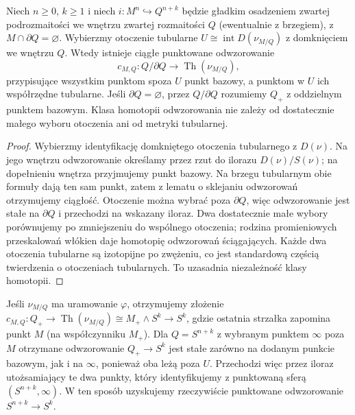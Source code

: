 \begin{lemat}
\label{lem:pt-collapse-v9}
Niech $n\ge0$, $k\ge1$ i niech
$i:M^n\hookrightarrow Q^{n+k}$ będzie gładkim
osadzeniem zwartej podrozmaitości we wnętrzu zwartej
rozmaitości $Q$ (ewentualnie z brzegiem), z
$M\cap\partial Q=\varnothing$. Wybierzmy otoczenie tubularne
$U\cong \operatorname{int}D(\nu_{M/Q})$ z domknięciem
we wnętrzu $Q$. Wtedy istnieje ciągłe punktowane
odwzorowanie
\[
c_{M,Q}: Q/\partial Q\longrightarrow
\operatorname{Th}(\nu_{M/Q}),
\]
przypisujące wszystkim punktom spoza $U$ punkt bazowy,
a punktom w $U$ ich współrzędne tubularne. Jeśli
$\partial Q=\varnothing$, przez $Q/\partial Q$ rozumiemy
$Q_+$ z oddzielnym punktem bazowym. Klasa homotopii
odwzorowania nie zależy od dostatecznie małego
wyboru otoczenia ani od metryki tubularnej.
\end{lemat}
\begin{proof}
Wybierzmy identyfikację domkniętego otoczenia
tubularnego z $D(\nu)$. Na jego wnętrzu odwzorowanie określamy przez
rzut do ilorazu $D(\nu)/S(\nu)$; na dopełnieniu
wnętrza przyjmujemy punkt bazowy. Na brzegu tubularnym
obie formuły dają ten sam punkt, zatem z lematu o
sklejaniu odwzorowań otrzymujemy ciągłość.
Otoczenie można wybrać poza $\partial Q$, więc
odwzorowanie jest stałe na $\partial Q$ i przechodzi
na wskazany iloraz. Dwa dostatecznie małe wybory
porównujemy po zmniejszeniu do wspólnego otoczenia;
rodzina promieniowych przeskalowań włókien daje
homotopię odwzorowań ściągających. Każde dwa
otoczenia tubularne są izotopijne po zwężeniu,
co jest standardową częścią twierdzenia o otoczeniach
tubularnych. To uzasadnia niezależność klasy homotopii.
\end{proof}

Jeśli $\nu_{M/Q}$ ma uramowanie $\varphi$, otrzymujemy
złożenie
$c_{M,Q}:Q_+\to\operatorname{Th}(\nu_{M/Q})
\cong M_+\wedge S^k\to S^k$, gdzie ostatnia strzałka
zapomina punkt $M$ (na współczynniku $M_+$).
Dla $Q=S^{n+k}$ z wybranym punktem $\infty$ poza $M$
otrzymane odwzorowanie $Q_+\to S^k$ jest stałe zarówno
na dodanym punkcie bazowym, jak i na $\infty$,
ponieważ oba leżą poza $U$.
Przechodzi więc przez iloraz utożsamiający
te dwa punkty, który identyfikujemy z
punktowaną sferą $(S^{n+k},\infty)$.
W ten sposób uzyskujemy rzeczywiście
punktowane odwzorowanie $S^{n+k}\to S^k$.

